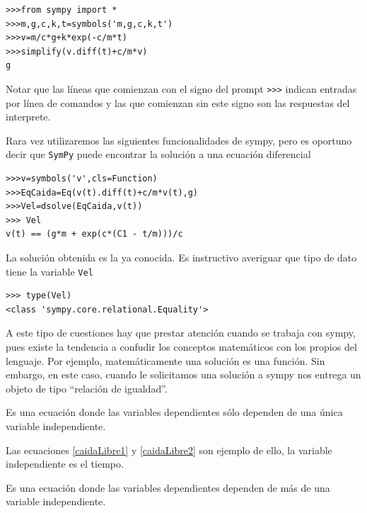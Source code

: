 \begin{lstlisting}
>>>from sympy import *
>>>m,g,c,k,t=symbols('m,g,c,k,t')
>>>v=m/c*g+k*exp(-c/m*t)
>>>simplify(v.diff(t)+c/m*v)
g
\end{lstlisting}
Notar que las líneas que comienzan con el signo del prompt \verb~>>>~ indican entradas por línea de comandos y las que comienzan sin este signo son las respuestas del interprete.

Rara vez utilizaremos las siguientes funcionalidades de sympy, pero es oportuno decir que
 \texttt{SymPy} puede encontrar la solución a una ecuación diferencial

\begin{lstlisting}
>>>v=symbols('v',cls=Function)
>>>EqCaida=Eq(v(t).diff(t)+c/m*v(t),g)
>>>Vel=dsolve(EqCaida,v(t))
>>> Vel
v(t) == (g*m + exp(c*(C1 - t/m)))/c
\end{lstlisting}

La solución obtenida es la ya conocida. Es instructivo averiguar que tipo de dato tiene la variable \verb~Vel~

\begin{lstlisting}
>>> type(Vel)
<class 'sympy.core.relational.Equality'>
\end{lstlisting}
A este tipo de cuestiones hay que prestar atención cuando se trabaja con sympy, \advertencia
pues existe la tendencia a confudir los conceptos matemáticos con los propios del lenguaje. 
Por ejemplo, matemáticamente una solución es una función. Sin embargo, en este caso, 
cuando le solicitamos una solución a sympy nos entrega un objeto de tipo  
``relación de igualdad''.





\begin{definicion} Es una ecuación donde las variables dependientes sólo dependen de una única variable independiente.
\end{definicion}

Las
ecuaciones \eqref{caidaLibre1} y \eqref{caidaLibre2} son ejemplo de ello, la variable independiente es el tiempo.
  \begin{definicion} Es una ecuación donde las variables dependientes dependen de más de una variable independiente.
   \end{definicion}

